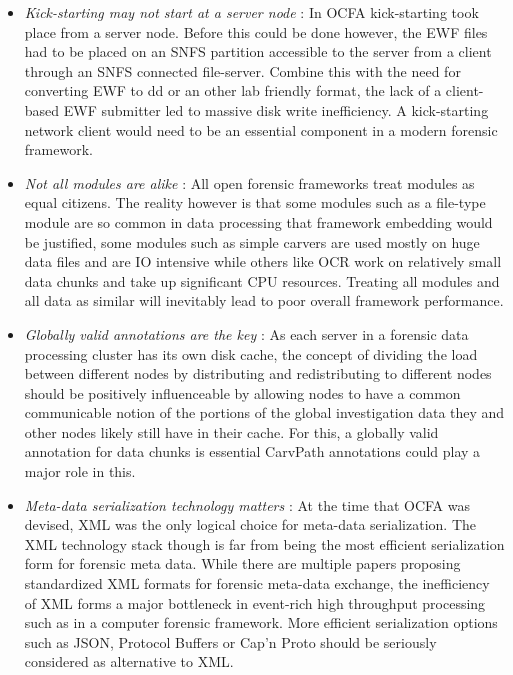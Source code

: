 \begin{itemize}
\item \emph{Kick-starting may not start at a server node} : In OCFA kick-starting took place from a server node. Before this could be done however, the EWF files had to be placed on an SNFS partition accessible to the server from a client through an SNFS connected file-server. Combine this with the need for converting EWF to dd or an other lab friendly format, the lack of a client-based EWF submitter led to massive disk write inefficiency. A kick-starting network client would need to be an essential component in a modern forensic framework.
\item \emph{Not all modules are alike} : All open forensic frameworks treat modules as equal citizens. The reality however is that some modules such as a file-type module are so common in data processing that framework embedding would be justified, some modules such as simple carvers are used mostly on huge data files and are IO intensive while others like OCR work on relatively small data chunks and take up significant CPU resources. Treating all modules and all data as similar will inevitably lead to poor overall framework performance. 
\item \emph{Globally valid annotations are the key} : As each server in a forensic data processing cluster has its own disk cache, the concept of dividing the load between different nodes by distributing and redistributing to different nodes should be positively influenceable by allowing nodes to have a common communicable notion of the portions of the global investigation data they and other nodes likely still have in their cache. For this, a globally valid annotation for data chunks is essential CarvPath annotations could play a major role in this.
\item \emph{Meta-data serialization technology matters} : At the time that OCFA was devised, XML was the only logical choice for meta-data serialization. The XML technology stack though is far from being the most efficient serialization form for forensic meta data. While there are multiple papers proposing standardized XML formats for forensic meta-data exchange, the inefficiency of XML forms a major bottleneck in event-rich high throughput processing such as in a computer forensic framework. More efficient serialization options such as JSON, Protocol Buffers or Cap'n Proto should be seriously considered as alternative to XML. 

\end{itemize}
